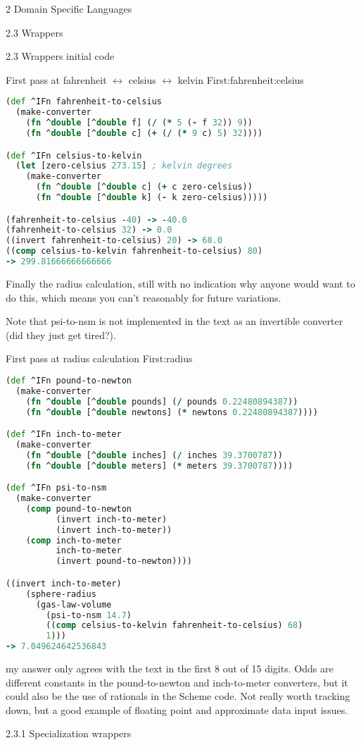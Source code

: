 \documentclass[12pt]{PalisadesLakesBook}
\begin{document}
\begin{plSection}{2 Domain Specific Languages}
\begin{plSection}{2.3 Wrappers}
\begin{plSection}{2.3 Wrappers initial code}
\begin{plListing}
{First pass at 
fahrenheit $\leftrightarrow$ celsius $\leftrightarrow$ kelvin}
{First:fahrenheit:celsius}
\begin{lstlisting}[language=clojure]
(def ^IFn fahrenheit-to-celsius
  (make-converter 
    (fn ^double [^double f] (/ (* 5 (- f 32)) 9))
    (fn ^double [^double c] (+ (/ (* 9 c) 5) 32))))

(def ^IFn celsius-to-kelvin
  (let [zero-celsius 273.15] ; kelvin degrees
    (make-converter 
      (fn ^double [^double c] (+ c zero-celsius))
      (fn ^double [^double k] (- k zero-celsius)))))

(fahrenheit-to-celsius -40) -> -40.0
(fahrenheit-to-celsius 32) -> 0.0
((invert fahrenheit-to-celsius) 20) -> 68.0
((comp celsius-to-kelvin fahrenheit-to-celsius) 80)
-> 299.81666666666666
\end{lstlisting}
\end{plListing}

Finally the radius calculation, 
still with no indication why anyone would want to do this,
which means you can't reasonably for future variations.

Note that {\schemeFont psi-to-nsm} is not implemented in the 
text as an invertible converter (did they just get tired?).

\begin{plListing}
{First pass at radius calculation}
{First:radius}
\begin{lstlisting}[language=clojure]
(def ^IFn pound-to-newton
  (make-converter 
    (fn ^double [^double pounds] (/ pounds 0.22480894387))
    (fn ^double [^double newtons] (* newtons 0.22480894387))))

(def ^IFn inch-to-meter
  (make-converter 
    (fn ^double [^double inches] (/ inches 39.3700787))
    (fn ^double [^double meters] (* meters 39.3700787))))

(def ^IFn psi-to-nsm
  (make-converter 
    (comp pound-to-newton
          (invert inch-to-meter)
          (invert inch-to-meter))
    (comp inch-to-meter 
          inch-to-meter 
          (invert pound-to-newton))))

((invert inch-to-meter)
    (sphere-radius
      (gas-law-volume
        (psi-to-nsm 14.7)
        ((comp celsius-to-kelvin fahrenheit-to-celsius) 68)
        1)))
-> 7.049624642536843
\end{lstlisting}
\end{plListing}

\TODO my answer only agrees with the text in the first 8 out of
15 digits. 
Odds are different constants in the {\schemeFont pound-to-newton}
and {\schemeFont inch-to-meter} converters, 
but it could also be the use of rationals in the Scheme code.
Not really worth tracking down, but a good example
of floating point and approximate data input issues.
\end{plSection}%
\begin{plSection}{2.3.1 Specialization wrappers}


\end{plSection}
\end{plSection}
\end{plSection}
\end{document}

